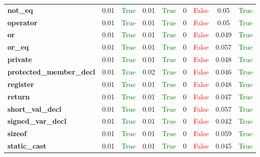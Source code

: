 \documentclass{article}
\begin{document}
\begin{xltabular}{\textwidth}{lcccccccc}
\textbf{{\fontsize{10}{12}\selectfont not\_eq}}& 0.01&\textcolor{green}{True}& 0.01&\textcolor{green}{True}& 0&\textcolor{red}{False}& 0.05&\textcolor{green}{True} \\[0.5ex]
\textbf{{\fontsize{10}{12}\selectfont operator}}& 0.01&\textcolor{green}{True}& 0.01&\textcolor{green}{True}& 0&\textcolor{red}{False}& 0.05&\textcolor{green}{True} \\[0.5ex]
\textbf{{\fontsize{10}{12}\selectfont or}}& 0.01&\textcolor{green}{True}& 0.01&\textcolor{green}{True}& 0&\textcolor{red}{False}& 0.049&\textcolor{green}{True} \\[0.5ex]
\textbf{{\fontsize{10}{12}\selectfont or\_eq}}& 0.01&\textcolor{green}{True}& 0.01&\textcolor{green}{True}& 0&\textcolor{red}{False}& 0.057&\textcolor{green}{True} \\[0.5ex]
\textbf{{\fontsize{10}{12}\selectfont private}}& 0.01&\textcolor{green}{True}& 0.01&\textcolor{green}{True}& 0&\textcolor{red}{False}& 0.048&\textcolor{green}{True} \\[0.5ex]
\textbf{{\fontsize{10}{12}\selectfont protected\_member\_decl}}& 0.01&\textcolor{green}{True}& 0.02&\textcolor{green}{True}& 0&\textcolor{red}{False}& 0.046&\textcolor{green}{True} \\[0.5ex]
\textbf{{\fontsize{10}{12}\selectfont register}}& 0.01&\textcolor{green}{True}& 0.01&\textcolor{green}{True}& 0&\textcolor{red}{False}& 0.048&\textcolor{green}{True} \\[0.5ex]
\textbf{{\fontsize{10}{12}\selectfont return}}& 0.01&\textcolor{green}{True}& 0.01&\textcolor{green}{True}& 0&\textcolor{red}{False}& 0.047&\textcolor{green}{True} \\[0.5ex]
\textbf{{\fontsize{10}{12}\selectfont short\_val\_decl}}& 0.01&\textcolor{green}{True}& 0.01&\textcolor{green}{True}& 0&\textcolor{red}{False}& 0.057&\textcolor{green}{True} \\[0.5ex]
\textbf{{\fontsize{10}{12}\selectfont signed\_var\_decl}}& 0.01&\textcolor{green}{True}& 0.01&\textcolor{green}{True}& 0&\textcolor{red}{False}& 0.042&\textcolor{green}{True} \\[0.5ex]
\textbf{{\fontsize{10}{12}\selectfont sizeof}}& 0.01&\textcolor{green}{True}& 0.01&\textcolor{green}{True}& 0&\textcolor{red}{False}& 0.059&\textcolor{green}{True} \\[0.5ex]
\textbf{{\fontsize{10}{12}\selectfont static\_cast}}& 0.01&\textcolor{green}{True}& 0.01&\textcolor{green}{True}& 0&\textcolor{red}{False}& 0.045&\textcolor{green}{True} \\[0.5ex]

\end{xltabular}
\end{document}
